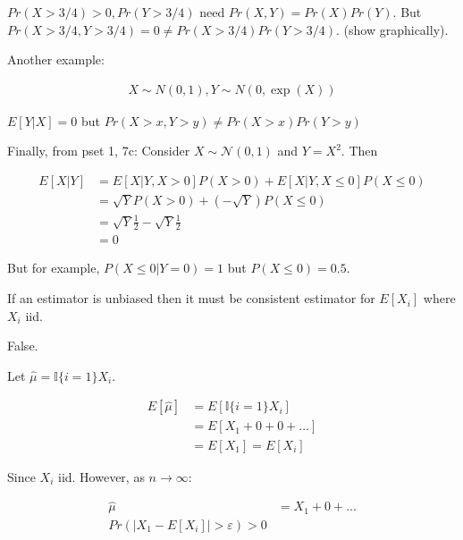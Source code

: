 \documentclass{exam}
\begin{document}
\begin{questions}
\begin{solution}
    $Pr(X > 3/4) > 0, Pr(Y > 3/4)$ need $Pr(X, Y) = Pr(X)Pr(Y)$.
    But $Pr(X > 3/4, Y > 3/4) = 0 \neq Pr(X > 3/4)Pr(Y > 3/4)$. (show graphically).


    Another example:

    \begin{align*}
        X \sim  N(0, 1), Y \sim N(0, \exp(X))
    \end{align*}

    $E[Y | X] = 0$ but $Pr(X > x, Y > y) \neq Pr(X > x) Pr(Y > y)$


    Finally, from pset 1, 7c:
    Consider $X\sim\mathcal{N}(0, 1)$ and $Y = X^2$. Then

        \begin{align*}
            E[X\vert Y] & = E[X\vert Y, X > 0] P(X > 0) + E[X\vert Y, X \leq 0] P(X \leq 0) \\
            & =  \sqrt{Y} P(X > 0) +\left(-\sqrt{Y}\right) P(X \leq 0) \\
            & =  \sqrt{Y} \frac{1}{2} -\sqrt{Y} \frac{1}{2} \\
            &=0
        \end{align*}

        But for example, $P(X\leq 0\vert Y = 0) = 1$ but $P(X\leq 0) = 0.5$. 
    \end{solution}


    \question If an estimator is unbiased then it must be consistent estimator for 
    $E[X_i]$ where $X_i$ iid.

    \begin{solution}
        False.

        Let $\hat{\mu} = \mathbb{I}\{i = 1\}X_i$.

        \begin{align*}
            E[\hat{\mu}] &= E[\mathbb{I}\{i = 1\}X_i]  \\
            &= E[X_1 + 0 + 0 + ...] \\
            &= E[X_1] = E[X_i]
        \end{align*}

        Since $X_i$ iid. However, as $n \rightarrow \infty$:

        \begin{align*}
            \hat{\mu} &= X_1 + 0 + ... \\
            Pr(|X_1 - E[X_i]| > \varepsilon) > 0
        \end{align*}
    \end{solution}



\end{questions}
\end{document}

